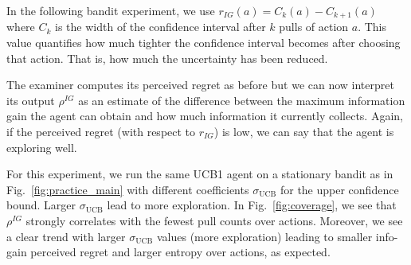 In the following bandit experiment, we use $r_{IG}(a) = C_k(a) - C_{k+1}(a)$ where $C_k$ is the width of the confidence interval after $k$ pulls of action $a$. 
This value quantifies how much tighter the confidence interval becomes after choosing that action. That is, how much the uncertainty has been reduced.

The examiner computes its perceived regret as before but we can now interpret its output $\rho^{IG}$ as an estimate of the difference between the maximum information gain the agent can obtain and how much  information it currently collects. 
Again, if the perceived regret (with respect to $r_{IG}$) is low, we can say that the agent is exploring well. 



For this experiment, we run the same UCB1 agent on a stationary bandit as in Fig.~\ref{fig:practice_main} with different coefficients $\sigma_{\text{UCB}}$ for the upper confidence bound. Larger $\sigma_{\text{UCB}}$ lead to more exploration.
In Fig.~\ref{fig:coverage}, we see that $\rho^{IG}$ strongly correlates  with the fewest pull counts over actions.
Moreover, we see a clear trend with larger $\sigma_{\text{UCB}}$ values (more exploration) leading to smaller info-gain perceived regret and larger entropy over actions, as expected. 
